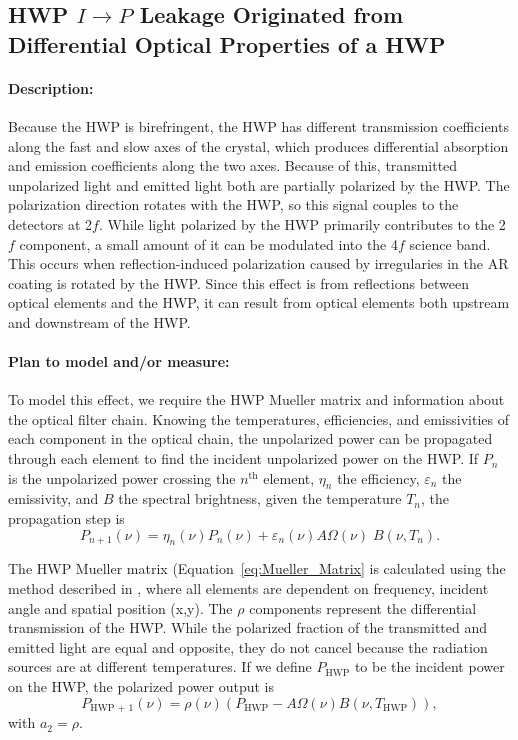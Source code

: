 
\subsection{HWP $I \rightarrow P$ Leakage Originated from Differential Optical Properties of a HWP}
\label{HWP Differential Optical Properties}

\paragraph{Description:}
Because the HWP is birefringent, the HWP has different transmission coefficients along the fast and slow axes of the crystal,
which produces differential absorption and emission coefficients along the two axes. Because of this, transmitted unpolarized light and emitted light both are partially polarized by the HWP. The polarization direction rotates with the HWP, so this signal couples to the detectors at 2$f$. While light polarized by the HWP primarily contributes to the 2$f$ component, a small amount of it can be modulated into the 4$f$ science band. This occurs when reflection-induced polarization caused by irregularies in the AR coating is rotated by the HWP\cite{Essinger-Hileman2013, Essinger-Hileman2016, ABS_HWP}. Since this effect is from reflections between optical elements and the HWP, it can result from optical elements both upstream and downstream of the HWP.

\paragraph{Plan to model and/or measure:}
To model this effect, we require the HWP Mueller matrix and information about the optical filter chain. Knowing the temperatures, efficiencies, and emissivities of each component in the optical chain,
the unpolarized power can be propagated through each element to find the incident unpolarized power on the HWP.
If $P_n$ is the unpolarized power crossing the $n^\text{th}$ element, $\eta_n$ the efficiency, $\varepsilon_n$ the emissivity, and $B$ the spectral brightness, given the temperature $T_n$,
the propagation step is 
\begin{equation}
\label{unpolarized_propagation}
P_{n+1}(\nu) = \eta_n(\nu) P_n(\nu) + \varepsilon_n(\nu) A\Omega(\nu)\;  B(\nu, T_n) .
\end{equation}


The HWP Mueller matrix (Equation~\ref{eq:Mueller_Matrix} is calculated using the method described in \cite{Salatino16}, where all elements are dependent on frequency, incident angle and spatial position (x,y). The $\rho$ components represent the differential transmission of the HWP. While the polarized fraction of the transmitted and emitted light are equal and opposite, they do not cancel because the radiation sources are at different temperatures.
If we define $P_\text{HWP}$ to be the incident power on the HWP, the polarized power output is 
\begin{equation}
\label{eq:polarized_output}
P_\text{HWP + 1}(\nu) = \rho(\nu)(P_\text{HWP} - A\Omega(\nu)B(\nu, T_\text{HWP})),
\end{equation}
with $a_2 = \rho$. 

